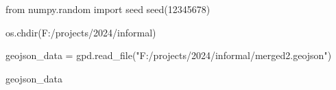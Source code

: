 \documentclass[
  letterpaper,
  DIV=11,
  numbers=noendperiod]{scrreprt}
\newenvironment{Shaded}{\begin{snugshade}}{\end{snugshade}}
\newcommand{\DecValTok}[1]{\textcolor[rgb]{0.68,0.00,0.00}{#1}}
\newcommand{\ImportTok}[1]{\textcolor[rgb]{0.00,0.46,0.62}{#1}}
\newcommand{\NormalTok}[1]{\textcolor[rgb]{0.00,0.23,0.31}{#1}}
\newcommand{\OperatorTok}[1]{\textcolor[rgb]{0.37,0.37,0.37}{#1}}
\newcommand{\StringTok}[1]{\textcolor[rgb]{0.13,0.47,0.30}{#1}}
\begin{document}
\begin{Shaded}
\begin{Highlighting}[]
\ImportTok{from}\NormalTok{ numpy.random }\ImportTok{import}\NormalTok{ seed}
\NormalTok{seed(}\DecValTok{12345678}\NormalTok{)}
\end{Highlighting}
\end{Shaded}

\begin{Shaded}
\begin{Highlighting}[]
\NormalTok{os.chdir(}\StringTok{\textquotesingle{}F:/projects/2024/informal\textquotesingle{}}\NormalTok{)}
\end{Highlighting}
\end{Shaded}

\begin{Shaded}
\begin{Highlighting}[]
\NormalTok{geojson\_data }\OperatorTok{=}\NormalTok{ gpd.read\_file(}\StringTok{"F:/projects/2024/informal/merged2.geojson"}\NormalTok{)}
\end{Highlighting}
\end{Shaded}

\begin{Shaded}
\begin{Highlighting}[]
\NormalTok{geojson\_data}
\end{Highlighting}
\end{Shaded}
\end{document}
